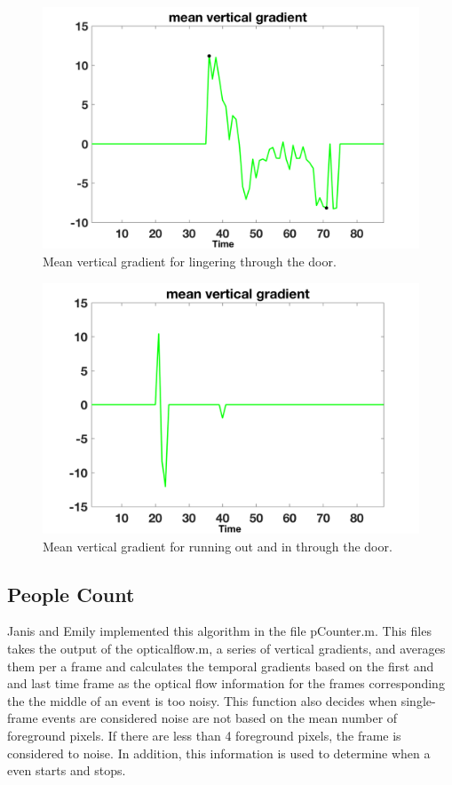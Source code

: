 \documentclass[12pt,oneside]{article} %
\begin{document}
\begin{figure}[htb]
\centering
\includegraphics[scale=0.52]{images/lingerThrough.png}
\caption{Mean vertical gradient for lingering through the door.}
\label{linger}
\end{figure}

\begin{figure}[htb]
\centering
\includegraphics[scale=0.52]{images/runoutandin.png}
\caption{Mean vertical gradient for running out and in through the door.}
\label{run}
\end{figure}

\subsection{People Count}
Janis and Emily implemented this algorithm in the file pCounter.m. This files takes the output of the opticalflow.m, a series of vertical gradients, and averages them per a frame and calculates the temporal gradients based on the first and and last time frame as the optical flow information for the frames corresponding the the middle of an event is too noisy. This function also decides when single-frame events are considered noise are not based on the mean number of foreground pixels. If there are less than 4 foreground pixels, the frame is considered to noise. In addition, this information is used to determine when a even starts and stops.
\end{document}
